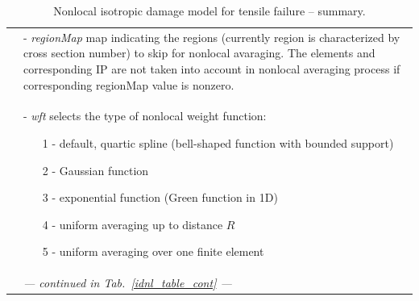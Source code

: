 \documentclass[a4paper]{article}
\newcommand{\param}[1]{{\it #1}}
\begin{document}
\begin{table}[!htb]
\begin{tabular}{|l|p{9cm}|}
&- \param{regionMap} map indicating the regions (currently region is
characterized by cross section number) to skip for nonlocal
avaraging. The elements and corresponding IP are not taken into
account in nonlocal averaging process if corresponding regionMap
value is nonzero.\\
&- \param{wft} selects the type of nonlocal weight function:
\begin{itemize}\setlength{\itemsep}{-3pt}
\item[1 -] default, quartic spline (bell-shaped function with bounded support)
\item[2 -] Gaussian function
\item[3 -] exponential function (Green function in 1D)
\item[4 -] uniform averaging up to distance $R$
\item[5 -] uniform averaging over one finite element
\end{itemize}\\
& {\it --- continued in Tab.~\ref{idnl_table_cont} ---} \\
\hline
\end{tabular}
\caption{Nonlocal isotropic damage model for tensile failure -- summary.}
\label{idnl_table}
\end{table}
\end{document}
